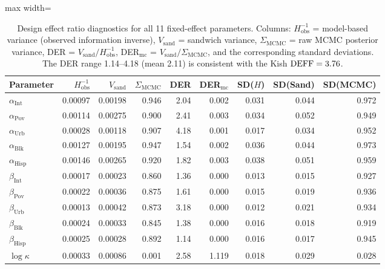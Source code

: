 \begin{table}[htbp]
\centering
\footnotesize
\begin{adjustbox}{max width=\textwidth}
\begin{tabular}{@{}l rrr rr rrr@{}}
  \toprule
  Parameter &
  $H_{\mathrm{obs}}^{-1}$ &
  $V_{\mathrm{sand}}$ &
  $\Sigma_{\mathrm{MCMC}}$ &
  DER &
  DER$_{\text{mc}}$ &
  SD($H$) &
  SD(Sand) &
  SD(MCMC) \\
  \midrule
  $\alpha_{\mathrm{Int}}$ & 0.00097 & 0.00198 & 0.946 & 2.04 & 0.002 & 0.031 & 0.044 & 0.972 \\
  $\alpha_{\mathrm{Pov}}$ & 0.00114 & 0.00275 & 0.900 & 2.41 & 0.003 & 0.034 & 0.052 & 0.949 \\
  $\alpha_{\mathrm{Urb}}$ & 0.00028 & 0.00118 & 0.907 & 4.18 & 0.001 & 0.017 & 0.034 & 0.952 \\
  $\alpha_{\mathrm{Blk}}$ & 0.00127 & 0.00195 & 0.947 & 1.54 & 0.002 & 0.036 & 0.044 & 0.973 \\
  $\alpha_{\mathrm{Hisp}}$ & 0.00146 & 0.00265 & 0.920 & 1.82 & 0.003 & 0.038 & 0.051 & 0.959 \\
  $\beta_{\mathrm{Int}}$ & 0.00017 & 0.00023 & 0.860 & 1.36 & 0.000 & 0.013 & 0.015 & 0.927 \\
  $\beta_{\mathrm{Pov}}$ & 0.00022 & 0.00036 & 0.875 & 1.61 & 0.000 & 0.015 & 0.019 & 0.936 \\
  $\beta_{\mathrm{Urb}}$ & 0.00013 & 0.00042 & 0.873 & 3.18 & 0.000 & 0.012 & 0.021 & 0.934 \\
  $\beta_{\mathrm{Blk}}$ & 0.00024 & 0.00033 & 0.845 & 1.38 & 0.000 & 0.016 & 0.018 & 0.919 \\
  $\beta_{\mathrm{Hisp}}$ & 0.00025 & 0.00028 & 0.892 & 1.14 & 0.000 & 0.016 & 0.017 & 0.945 \\
  $\log\kappa$ & 0.00033 & 0.00086 & 0.001 & 2.58 & 1.119 & 0.018 & 0.029 & 0.028 \\
  \bottomrule
\end{tabular}
\end{adjustbox}
\caption{Design effect ratio diagnostics for all 11 fixed-effect
  parameters.  Columns: $H_{\mathrm{obs}}^{-1}$ = model-based variance
  (observed information inverse), $V_{\mathrm{sand}}$ = sandwich
  variance, $\Sigma_{\mathrm{MCMC}}$ = raw MCMC posterior variance,
  DER = $V_{\mathrm{sand}} / H_{\mathrm{obs}}^{-1}$,
  DER$_{\text{mc}}$ = $V_{\mathrm{sand}} / \Sigma_{\mathrm{MCMC}}$,
  and the corresponding standard deviations.  The DER range 1.14--4.18
  (mean 2.11) is consistent with the Kish $\text{DEFF} = 3.76$.}
\label{smd:tab-der}
\end{table}

